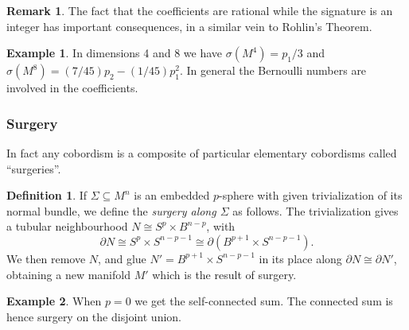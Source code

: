 \documentclass{article}
\theoremstyle{definition}
\newtheorem*{definition}{Definition}
\newtheorem*{example}{Example}
\newtheorem*{remark}{Remark}
\begin{document}
\begin{remark}
    The fact that the coefficients are rational while the signature is an
    integer has important consequences, in a similar vein to Rohlin's Theorem.
\end{remark}

\begin{example}
    In dimensions 4 and 8 we have $\sigma(M^4)=p_1/3$ and
    $\sigma(M^8)=(7/45)p_2-(1/45)p_1^2$. In general the Bernoulli numbers are
    involved in the coefficients.
\end{example}

\subsubsection*{Surgery}

In fact any cobordism is a composite of particular elementary cobordisms called
``surgeries''.

\begin{definition}
    If $\Sigma\subseteq M^n$ is an embedded $p$-sphere with given trivialization
    of its normal bundle, we define the \emph{surgery along $\Sigma$} as
    follows. The trivialization gives a tubular neighbourhood
    $N\cong S^p\times B^{n-p}$, with
    \begin{equation*}
        \partial N
            \cong S^p\times S^{n-p-1}
            \cong \partial(B^{p+1}\times S^{n-p-1}).
    \end{equation*}
    We then remove $N$, and glue $N'=B^{p+1}\times S^{n-p-1}$ in its place along
    $\partial N\cong\partial N'$, obtaining a new manifold $M'$ which is the
    result of surgery.
\end{definition}

\begin{example}
    When $p=0$ we get the self-connected sum. The connected sum is hence surgery
    on the disjoint union.
\end{example}
\end{document}
